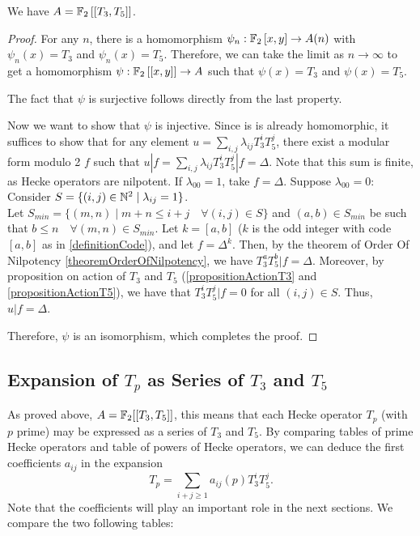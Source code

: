 \begin{property}
	We have $A = \mathbb{F}_2 \left[\left[ T_3, T_5 \right]\right]$.
\end{property}
\begin{proof}
	For any $n$, there is a homomorphism $\psi_n: \mathbb{F}_2 \left[ x, y \right] \to A(n)$ with $\psi_n(x) = T_3$ and $\psi_n(x) = T_5$.
	Therefore, we can take the limit as $n \to \infty$ to get a homomorphism $\psi: \mathbb{F}_2 \left[\left[ x, y \right]\right] \to A$ such that $\psi(x) = T_3$ and $\psi(x) = T_5$.
	
	The fact that $\psi$ is surjective follows directly from the last property.
	
	Now we want to show that $\psi$ is injective.
	Since is is already homomorphic, it suffices to show that for any element $u = \sum_{i,j} \lambda_{ij}T_3^iT_5^j$, there exist a modular form modulo 2 $f$ such that $u|f = \sum_{i,j} \lambda_{ij}T_3^iT_5^j|f = \Delta$.
	Note that this sum is finite, as Hecke operators are nilpotent.
	If $\lambda_{00}=1$, take $f=\Delta$.
	Suppose $\lambda_{00}=0$: Consider $S = \{ (i,j) \in \mathbb{N}^2 \mid \lambda_{ij}=1 \}$.\\
	Let $S_{min} = \{ (m,n) \mid m+n \leq i+j \quad \forall (i,j) \in S \}$ and $(a,b) \in S_{min}$ be such that $b \leq n \quad \forall (m,n) \in S_{min}$.
	Let $k = [a,b]$ ($k$ is the odd integer with code $[a,b]$ as in \ref{definitionCode}), and let $f = \Delta^k$.
	Then, by the theorem of Order Of Nilpotency \ref{theoremOrderOfNilpotency}, we have $T_3^aT_5^b|f=\Delta$.
	Moreover, by proposition on action of $T_3$ and $T_5$ (\ref{propositionActionT3} and \ref{propositionActionT5}), we have that $T_3^iT_5^j|f=0$ for all $(i,j) \in S$.
	Thus, $u|f = \Delta$.
	
	Therefore, $\psi$ is an isomorphism, which completes the proof.
\end{proof}



\subsection{Expansion of $T_p$ as Series of $T_3$ and $T_5$}
As proved above, $A = \mathbb{F}_2[[T_3, T_5]]$, this means that each Hecke operator $T_p$ (with $p$ prime) may be expressed as a series of $T_3$ and $T_5$.
By comparing tables of prime Hecke operators and table of powers of Hecke operators, we can deduce the first coefficients $a_{ij}$ in the expansion 
$$
T_p = \sum_{i+j \geq 1} a_{ij}(p) T_3^iT_5^j.
$$
Note that the coefficients will play an important role in the next sections.
We compare the two following tables:
